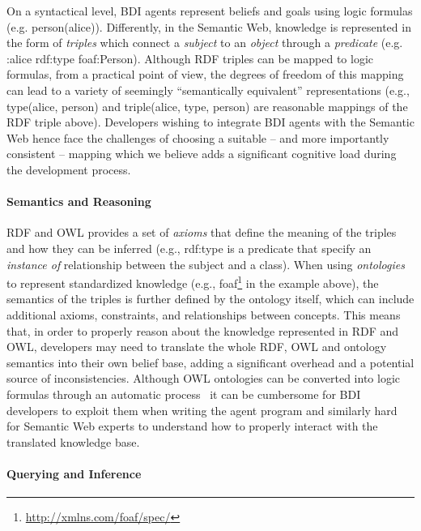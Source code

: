 \documentclass[
]{ceurart}
\begin{document}
On a syntactical level, \ac{BDI} agents represent beliefs and goals using logic formulas
(e.g. \textsf{person(alice)}).
%
Differently, in the Semantic Web, knowledge is represented in the form of \emph{triples} which connect a \emph{subject} to an \emph{object} through a \emph{predicate} (e.g. \textsf{:alice rdf:type foaf:Person}).
%
Although \ac{RDF} triples can be mapped to logic formulas, from a practical point of view, the degrees of freedom of this mapping can lead to a variety of seemingly ``semantically equivalent'' representations (e.g., \textsf{type(alice, person)} and \textsf{triple(alice, type, person)} are reasonable mappings of the \ac{RDF} triple above).
%
Developers wishing to integrate \ac{BDI} agents with the Semantic Web hence face the challenges of choosing a suitable -- and more importantly consistent -- mapping which we believe adds a significant cognitive load during the development process.

\paragraph{Semantics and Reasoning}
\ac{RDF} and \ac{OWL} provides a set of \emph{axioms} that define the meaning of the triples and how they can be inferred (e.g., \textsf{rdf:type} is a predicate that specify an \emph{instance of} relationship between the subject and a class).
%
When using \emph{ontologies} to represent standardized knowledge (e.g., \textsf{foaf}\footnote{\url{http://xmlns.com/foaf/spec/}} in the example above), 
the semantics of the triples is further defined by the ontology itself,
which can include additional axioms, constraints, and relationships between concepts.
%
This means that, in order to properly reason about the knowledge represented in \ac{RDF} and \ac{OWL},
developers may need to translate the whole \ac{RDF}, \ac{OWL} and ontology semantics into their own belief base, adding a significant overhead and a potential source of inconsistencies. 
Although \ac{OWL} ontologies can be converted into logic formulas through an automatic process~\cite{samuel2008tplp}
it can be cumbersome for \ac{BDI} developers to exploit them when writing the agent program
and similarly hard for Semantic Web experts to understand how to properly interact with the translated knowledge base.

\paragraph{Querying and Inference}
\end{document}
